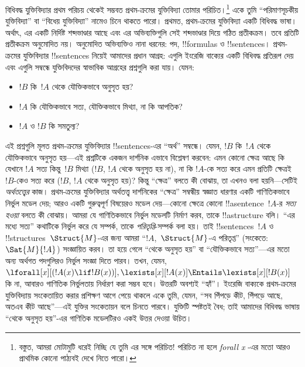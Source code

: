 \documentclass[../../../include/open-logic-section]{subfiles}
\begin{document}


বিধিবদ্ধ যুক্তিবিদ্যার প্রথম পরিচয় থেকেই সম্ভবত প্রথম-ক্রমের যুক্তিবিদ্যা
তোমার পরিচিত।\footnote{বস্তুত, আমরা মোটামুটি ধরেই নিচ্ছি যে তুমি এর সঙ্গে
পরিচিত!{} পরিচিত না হলে \emph{forall x} \citep{Magnus2021}-এর মতো আরও
প্রাথমিক কোনো পাঠ্যবই দেখে নিতে পারো।} একে তুমি “পরিমাণসূচকীয়
যুক্তিবিদ্যা” বা “বিধেয় যুক্তিবিদ্যা” নামেও চিনে থাকতে পারো। প্রথমত,
প্রথম-ক্রমের যুক্তিবিদ্যা একটি বিধিবদ্ধ ভাষা। অর্থাৎ, এর একটি নির্দিষ্ট
শব্দভাণ্ডার আছে এবং এর অভিব্যক্তিগুলি সেই শব্দভাণ্ডার দিয়ে গঠিত
প্রতীকক্রম। তবে প্রতিটি প্রতীকক্রম অনুমোদিত নয়। অনুমোদিত অভিব্যক্তিও নানা
ধরনের: পদ, !!{formula}s ও !!{sentence}s। প্রথম-ক্রমের যুক্তিবিদ্যার
!!{sentence}s নিয়েই আমাদের প্রধান আগ্রহ: এগুলি ইংরেজি বাক্যের একটি
বিধিবদ্ধ প্রতিরূপ দেয় এবং এগুলি সম্বন্ধে যুক্তিবিদদের স্বাভাবিক আগ্রহের
প্রশ্নগুলি করা যায়। যেমন:
\begin{itemize}
    \item $!B$ কি~$!A$ থেকে যৌক্তিকভাবে অনুসৃত হয়?
    \item $!A$ কি যৌক্তিকভাবে সত্য, যৌক্তিকভাবে মিথ্যা, না কি
আপতিক?
    \item $!A$ ও $!B$ কি সমতুল্য?
\end{itemize}

এই প্রশ্নগুলি মূলত প্রথম-ক্রমের যুক্তিবিদ্যার !!{sentence}s-এর “অর্থ”
সম্বন্ধে। যেমন, $!B$ কি~$!A$ থেকে যৌক্তিকভাবে অনুসৃত হয়—এই প্রশ্নটিকে
একজন দার্শনিক এভাবে বিশ্লেষণ করবেন: এমন কোনো ক্ষেত্র আছে কি যেখানে $!A$
সত্য কিন্তু~$!B$ মিথ্যা ($!B$, $!A$ থেকে অনুসৃত হয় না), না কি $!A$-কে
সত্য করে এমন প্রতিটি ক্ষেত্রই~$!B$-কেও সত্য করে ($!B$, $!A$ থেকে
অনুসৃত হয়)? কিন্তু “ক্ষেত্র” বলতে কী বোঝায়, তা এখনও বলা হয়নি—সেটিই
\emph{অর্থতত্ত্বের} কাজ। প্রথম-ক্রমের যুক্তিবিদ্যার অর্থতত্ত্ব দার্শনিকের
“ক্ষেত্র” সম্বন্ধীয় স্বজ্ঞাত ধারণার একটি গাণিতিকভাবে নির্ভুল মডেল দেয়;
আরও একটি গুরুত্বপূর্ণ বিষয়েরও মডেল দেয়—কোনো ক্ষেত্রে কোনো
!!a{sentence}~$!A$-র \emph{সত্য হওয়া} বলতে কী বোঝায়। আমরা যে
গাণিতিকভাবে নির্ভুল মডেলটি নির্মাণ করব, তাকে !!a{structure} বলি। “এর
মধ্যে সত্য” কথাটিকে নির্ভুল করে যে সম্পর্ক, তাকে \emph{পরিতৃপ্তি}-সম্পর্ক
বলা হয়। তাই !!{sentence}s~$!A$ ও !!{structure}s~$\Struct{M}$-এর জন্য
আমরা “$!A$,~$\Struct{M}$-এ পরিতৃপ্ত” (সংকেতে: $\Sat{M}{!A}$) সংজ্ঞায়িত
করব। তা হয়ে গেলে “থেকে অনুসৃত হয়” বা “যৌক্তিকভাবে সত্য”—এর মতো অন্য
অর্থগত পদগুলিরও নির্ভুল সংজ্ঞা দিতে পারব। তখন, যেমন,
$\lforall[x][(!A(x) \lif !B(x))], \lexists[x][!A(x)] \Entails
\lexists[x][!B(x)]$ কি না, আবারও গাণিতিক নির্ভুলতায় নির্ধারণ করা সম্ভব
হবে। উত্তরটি অবশ্যই “হ্যাঁ”। ইংরেজি বাক্যকে প্রথম-ক্রমের যুক্তিবিদ্যায়
সংকেতায়িত করার প্রশিক্ষণ আগে পেয়ে থাকলে একে তুমি, যেমন, “সব পিঁপড়ে
কীট, পিঁপড়ে আছে, অতএব কীট আছে”—এই যুক্তির সংকেতায়ন বলে চিনতে পারবে।
যুক্তিটি স্পষ্টতই বৈধ; তাই আমাদের বিধিবদ্ধ ভাষায় “থেকে অনুসৃত হয়”-এর
গাণিতিক মডেলটিরও একই উত্তর দেওয়া উচিত।
\end{document}
